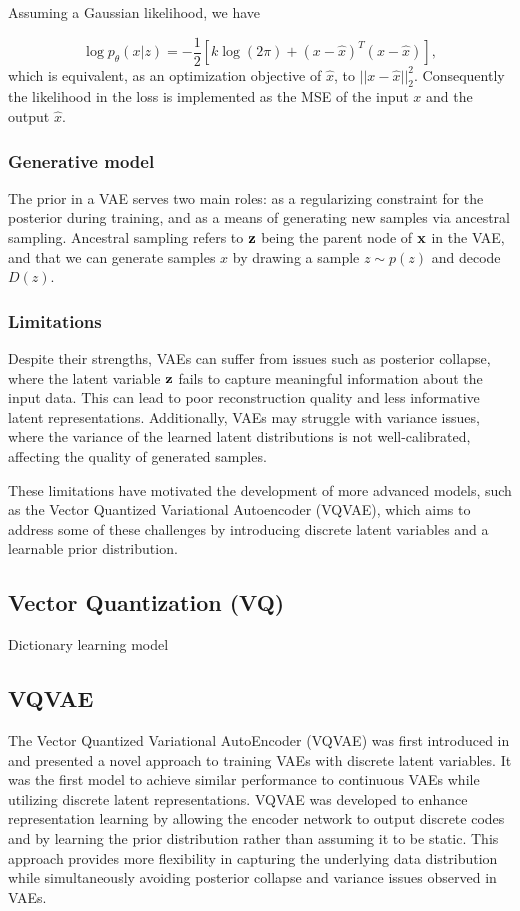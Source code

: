 \documentclass[../../thesis.tex]{subfiles}
\begin{document}
Assuming a Gaussian likelihood, we have

\begin{equation}
    \log p_\theta(x|z) = -\frac12 \left[k\log(2\pi)+ (x-\widehat{x})^T(x-\widehat{x})\right],
\end{equation}
which is equivalent, as an optimization objective of $\widehat{x}$, to $||x-\widehat{x}||_2^2$. Consequently the likelihood in the loss is implemented as the MSE of the input $x$ and the output $\widehat{x}$.

\subsubsection{Generative model}
The prior in a VAE serves two main roles: as a regularizing constraint for the posterior during training, and as a means of generating new samples via ancestral sampling. Ancestral sampling refers to $\mathbf{z}$ being the parent node of $\mathbf{x}$ in the VAE, and that we can generate samples $x$ by drawing a sample $z\sim p(z)$ and decode $D(z)$. 


\subsubsection{Limitations}

Despite their strengths, VAEs can suffer from issues such as posterior collapse, where the latent variable $\mathbf{z}$ fails to capture meaningful information about the input data. This can lead to poor reconstruction quality and less informative latent representations. Additionally, VAEs may struggle with variance issues, where the variance of the learned latent distributions is not well-calibrated, affecting the quality of generated samples.\newline

These limitations have motivated the development of more advanced models, such as the Vector Quantized Variational Autoencoder (VQVAE), which aims to address some of these challenges by introducing discrete latent variables and a learnable prior distribution.

\subsection{Vector Quantization (VQ)}
Dictionary learning model \cite{Gray1984VQ}

\subsection{VQVAE}
The Vector Quantized Variational AutoEncoder (VQVAE) was first introduced in \cite{VQVAE} and presented a novel approach to training VAEs with discrete latent variables. It was the first model to achieve similar performance to continuous VAEs while utilizing discrete latent representations. VQVAE was developed to enhance representation learning by allowing the encoder network to output discrete codes and by learning the prior distribution rather than assuming it to be static. This approach provides more flexibility in capturing the underlying data distribution while simultaneously avoiding posterior collapse and variance issues observed in VAEs.
\end{document}
